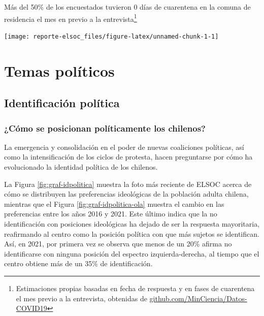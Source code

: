 \documentclass[
  12pt,
]{book}
\begin{document}
Más del 50\% de los encuestados tuvieron 0 días de cuarentena en la comuna de residencia el mes en previo a la entrevista\footnote{Estimaciones propias basadas en fecha de respuesta y en fases de cuarentena el mes previo a la entrevista, obtenidas de \href{https://github.com/MinCiencia/Datos-COVID19}{github.com/MinCiencia/Datos-COVID19}}

\begin{center}\texttt{[image: reporte-elsoc\_files/figure-latex/unnamed-chunk-1-1]} \end{center}

\hypertarget{temas-poluxedticos}{%
\chapter{Temas políticos}\label{temas-poluxedticos}}

\hypertarget{identificaciuxf3n-poluxedtica}{%
\section{Identificación política}\label{identificaciuxf3n-poluxedtica}}

\hypertarget{cuxf3mo-se-posicionan-poluxedticamente-los-chilenos}{%
\subsection*{¿Cómo se posicionan políticamente los chilenos?}\label{cuxf3mo-se-posicionan-poluxedticamente-los-chilenos}}

La emergencia y consolidación en el poder de nuevas coaliciones políticas, así como la intensificación de los ciclos de protesta, hacen preguntarse por cómo ha evolucionado la identidad política de los chilenos.

La Figura \ref{fig:graf-idpolitica} muestra la foto más reciente de ELSOC acerca de cómo se distribuyen las preferencias ideológicas de la población adulta chilena, mientras que el Figura \ref{fig:graf-idpolitica-ola} muestra el cambio en las preferencias entre los años 2016 y 2021. Este último indica que la no identificación con posiciones ideológicas ha dejado de ser la respuesta mayoritaria, reafirmando al centro como la posición política con que más sujetos se identifican. Así, en 2021, por primera vez se observa que menos de un 20\% afirma no identificarse con ninguna posición del espectro izquierda-derecha, al tiempo que el centro obtiene más de un 35\% de identificación.
\end{document}
